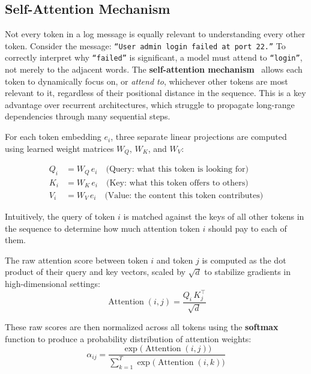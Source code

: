 \subsection{Self-Attention Mechanism}


Not every token in a log message is equally relevant to understanding every other token. Consider the message: \texttt{``User admin login failed at port 22.''} To correctly interpret why \texttt{``failed''} is significant, a model must attend to \texttt{``login''}, not merely to the adjacent words. The \textbf{self-attention mechanism}~\cite{vaswani2017attention} allows each token to dynamically focus on, or \emph{attend to}, whichever other tokens are most relevant to it, regardless of their positional distance in the sequence. This is a key advantage over recurrent architectures, which struggle to propagate long-range dependencies through many sequential steps.


For each token embedding $e_i$, three separate linear projections are computed using learned weight matrices $W_Q$, $W_K$, and $W_V$:

\begin{align}
Q_i &= W_Q\, e_i \quad \text{(Query: what this token is looking for)} \\
K_i &= W_K\, e_i \quad \text{(Key: what this token offers to others)} \\
V_i &= W_V\, e_i \quad \text{(Value: the content this token contributes)}
\end{align}

Intuitively, the query of token $i$ is matched against the keys of all other tokens in the sequence to determine how much attention token $i$ should pay to each of them.


The raw attention score between token $i$ and token $j$ is computed as the dot product of their query and key vectors, scaled by $\sqrt{d}$ to stabilize gradients in high-dimensional settings:
\begin{equation}
\operatorname{Attention}(i,j) = \frac{Q_i\, K_j^{\top}}{\sqrt{d}}
\end{equation}

These raw scores are then normalized across all tokens using the \textbf{softmax} function to produce a probability distribution of attention weights:
\begin{equation}
\alpha_{ij} = \frac{\exp\!\bigl(\operatorname{Attention}(i,j)\bigr)}{\displaystyle\sum_{k=1}^{T} \exp\!\bigl(\operatorname{Attention}(i,k)\bigr)}
\end{equation}

